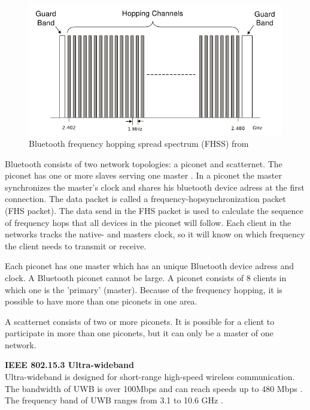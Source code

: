 \documentclass[10pt,a4paper]{article}
\begin{document}
\begin{figure}[H]
   \centering
   \includegraphics[width=1\textwidth]{bluetoothfh}
   \caption{Bluetooth frequency hopping spread spectrum (FHSS) from \cite{bluetoothspectrum}}
   \label{fig:bluetoothfh}
\end{figure}

Bluetooth consists of two network topologies: a piconet and scatternet. The piconet has one or more slaves serving one master \cite{bluetoothpiconet}. In a piconet the master synchronizes the master's clock and shares his bluetooth device adress at the first connection. The data packet is called a frequency-hopsynchronization packet (FHS packet). The data send in the FHS packet is used to calculate the sequence of frequency hops that all devices in the piconet will follow. Each client in the networks tracks the native- and masters clock, so it will know on which frequency the client needs to transmit or receive.

Each piconet has one master which has an unique Bluetooth device adress and clock. A Bluetooth piconet cannot be large. A piconet consists of 8 clients in which one is the 'primary' (master).\cite{tcipbook} Because of the frequency hopping, it is possible to have more than one piconets in one area. 

A scatternet consists of two or more piconets. It is possible for a client to participate in more than one piconets, but it can only be a master of one network.

\textbf{IEEE 802.15.3 Ultra-wideband}\\
Ultra-wideband is designed for short-range high-speed wireless communication. The bandwidth of UWB is over 100Mbps and can reach speeds up to 480 Mbps \cite{comparitivestudywirelessprotocols}. The frequency band of UWB ranges from 3.1 to 10.6 GHz \cite{ultrawidebandwirelesscommunications}.
\end{document}
